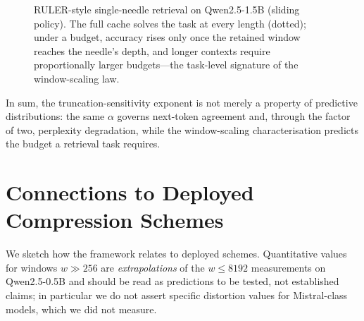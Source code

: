 \documentclass[11pt]{article}
\theoremstyle{plain}
\theoremstyle{definition}
\theoremstyle{remark}
\begin{document}
\begin{figure}[t]
\centering
{}
\caption{RULER-style single-needle retrieval on Qwen2.5-1.5B (sliding
policy). The full cache solves the task at every length (dotted); under
a budget, accuracy rises only once the retained window reaches the
needle's depth, and longer contexts require proportionally larger
budgets---the task-level signature of the window-scaling law.}
\label{fig:ruler}
\end{figure}

In sum, the truncation-sensitivity exponent is not merely a property of
predictive distributions: the same $\alpha$ governs next-token agreement
and, through the factor of two, perplexity degradation, while the
window-scaling characterisation predicts the budget a retrieval task
requires.


\section{Connections to Deployed Compression Schemes}
\label{sec:discussion}

We sketch how the framework relates to deployed schemes. Quantitative
values for windows $w \gg 256$ are \emph{extrapolations} of the
$w \le 8192$ measurements on Qwen2.5-0.5B and should be read as
predictions to be tested, not established claims; in particular we do
not assert specific distortion values for Mistral-class models, which
we did not measure.
\end{document}
